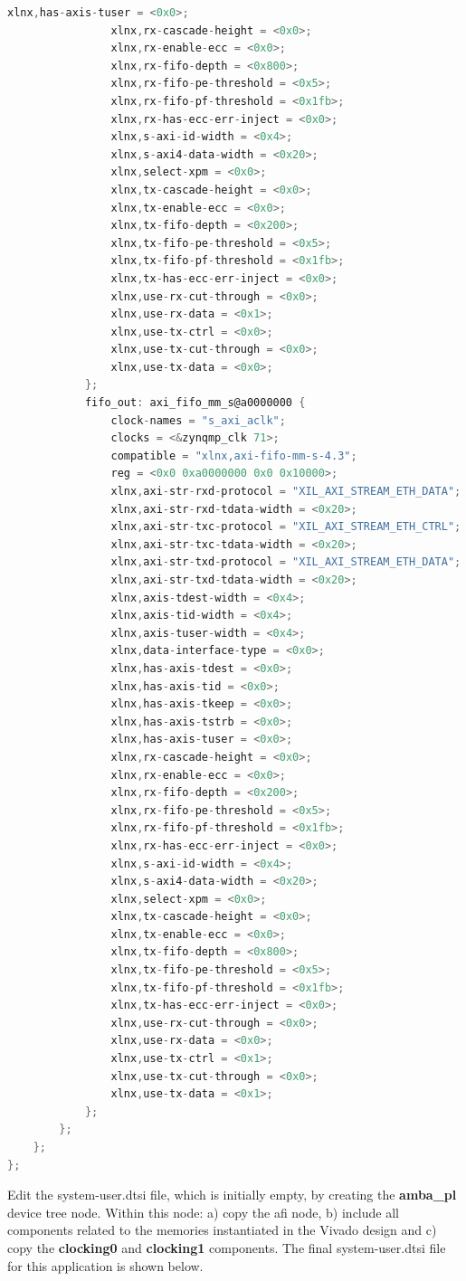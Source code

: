 \begin{lstlisting}[language=C]
				xlnx,has-axis-tuser = <0x0>;
				xlnx,rx-cascade-height = <0x0>;
				xlnx,rx-enable-ecc = <0x0>;
				xlnx,rx-fifo-depth = <0x800>;
				xlnx,rx-fifo-pe-threshold = <0x5>;
				xlnx,rx-fifo-pf-threshold = <0x1fb>;
				xlnx,rx-has-ecc-err-inject = <0x0>;
				xlnx,s-axi-id-width = <0x4>;
				xlnx,s-axi4-data-width = <0x20>;
				xlnx,select-xpm = <0x0>;
				xlnx,tx-cascade-height = <0x0>;
				xlnx,tx-enable-ecc = <0x0>;
				xlnx,tx-fifo-depth = <0x200>;
				xlnx,tx-fifo-pe-threshold = <0x5>;
				xlnx,tx-fifo-pf-threshold = <0x1fb>;
				xlnx,tx-has-ecc-err-inject = <0x0>;
				xlnx,use-rx-cut-through = <0x0>;
				xlnx,use-rx-data = <0x1>;
				xlnx,use-tx-ctrl = <0x0>;
				xlnx,use-tx-cut-through = <0x0>;
				xlnx,use-tx-data = <0x0>;
			};
			fifo_out: axi_fifo_mm_s@a0000000 {
				clock-names = "s_axi_aclk";
				clocks = <&zynqmp_clk 71>;
				compatible = "xlnx,axi-fifo-mm-s-4.3";
				reg = <0x0 0xa0000000 0x0 0x10000>;
				xlnx,axi-str-rxd-protocol = "XIL_AXI_STREAM_ETH_DATA";
				xlnx,axi-str-rxd-tdata-width = <0x20>;
				xlnx,axi-str-txc-protocol = "XIL_AXI_STREAM_ETH_CTRL";
				xlnx,axi-str-txc-tdata-width = <0x20>;
				xlnx,axi-str-txd-protocol = "XIL_AXI_STREAM_ETH_DATA";
				xlnx,axi-str-txd-tdata-width = <0x20>;
				xlnx,axis-tdest-width = <0x4>;
				xlnx,axis-tid-width = <0x4>;
				xlnx,axis-tuser-width = <0x4>;
				xlnx,data-interface-type = <0x0>;
				xlnx,has-axis-tdest = <0x0>;
				xlnx,has-axis-tid = <0x0>;
				xlnx,has-axis-tkeep = <0x0>;
				xlnx,has-axis-tstrb = <0x0>;
				xlnx,has-axis-tuser = <0x0>;
				xlnx,rx-cascade-height = <0x0>;
				xlnx,rx-enable-ecc = <0x0>;
				xlnx,rx-fifo-depth = <0x200>;
				xlnx,rx-fifo-pe-threshold = <0x5>;
				xlnx,rx-fifo-pf-threshold = <0x1fb>;
				xlnx,rx-has-ecc-err-inject = <0x0>;
				xlnx,s-axi-id-width = <0x4>;
				xlnx,s-axi4-data-width = <0x20>;
				xlnx,select-xpm = <0x0>;
				xlnx,tx-cascade-height = <0x0>;
				xlnx,tx-enable-ecc = <0x0>;
				xlnx,tx-fifo-depth = <0x800>;
				xlnx,tx-fifo-pe-threshold = <0x5>;
				xlnx,tx-fifo-pf-threshold = <0x1fb>;
				xlnx,tx-has-ecc-err-inject = <0x0>;
				xlnx,use-rx-cut-through = <0x0>;
				xlnx,use-rx-data = <0x0>;
				xlnx,use-tx-ctrl = <0x1>;
				xlnx,use-tx-cut-through = <0x0>;
				xlnx,use-tx-data = <0x1>;
			};
		};
	};
};
\end{lstlisting}
\vspace{0.1cm}
Edit the system-user.dtsi file, which is initially empty, by creating the \textbf{amba\_pl} device tree node. Within this node: a) copy the afi node, b) include all components related to the memories instantiated in the Vivado design and c) copy the \textbf{clocking0} and \textbf{clocking1} components. The final system-user.dtsi file for this application is shown below.
